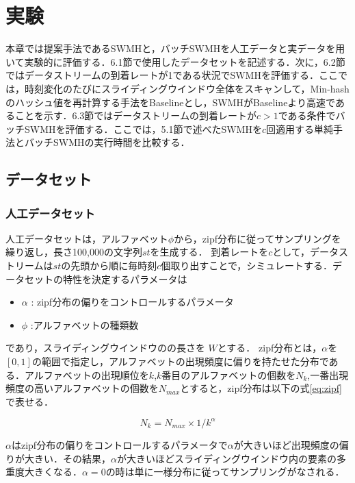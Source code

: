 \chapter{実験}
本章では提案手法であるSWMHと，バッチSWMHを人工データと実データを用いて実験的に評価する．6.1節で使用したデータセットを記述する．次に，6.2節ではデータストリームの到着レートが1である状況でSWMHを評価する．ここでは，時刻変化のたびにスライディングウインドウ全体をスキャンして，Min-hashのハッシュ値を再計算する手法をBaselineとし，SWMHがBaselineより高速であることを示す．6.3節ではデータストリームの到着レートが$c>1$である条件でバッチSWMHを評価する．ここでは，5.1節で述べたSWMHを$c$回適用する単純手法とバッチSWMHの実行時間を比較する．





\section{データセット}
\subsection{人工データセット}
人工データセットは，アルファベット$\phi$から，zipf分布に従ってサンプリングを繰り返し，長さ100,000の文字列$st$を生成する．
到着レートを$c$として，データストリームは$st$の先頭から順に毎時刻$c$個取り出すことで，シミュレートする．データセットの特性を決定するパラメータは
\begin{itemize}
\item $\alpha$ : zipf分布の偏りをコントロールするパラメータ
\item $\phi$ :アルファベットの種類数
\end{itemize}

であり，スライディングウインドウのの長さを $W$とする．
zipf分布とは，$\alpha$を$[0,1]$の範囲で指定し，アルファベットの出現頻度に偏りを持たせた分布である．アルファベットの出現順位を$k$,$k$番目のアルファベットの個数を$N_k$,一番出現頻度の高いアルファベットの個数を$N_{max}$とすると，zipf分布は以下の式\ref{eq:zipf}で表せる．

\begin{equation}
 \label{eq:zipf}
N_k = N_{max} \times 1/k^\alpha
\end{equation}

$\alpha$はzipf分布の偏りをコントロールするパラメータで$\alpha$が大きいほど出現頻度の偏りが大きい．その結果，$\alpha$が大きいほどスライディングウインドウ内の要素の多重度大きくなる．$\alpha = 0$の時は単に一様分布に従ってサンプリングがなされる．

